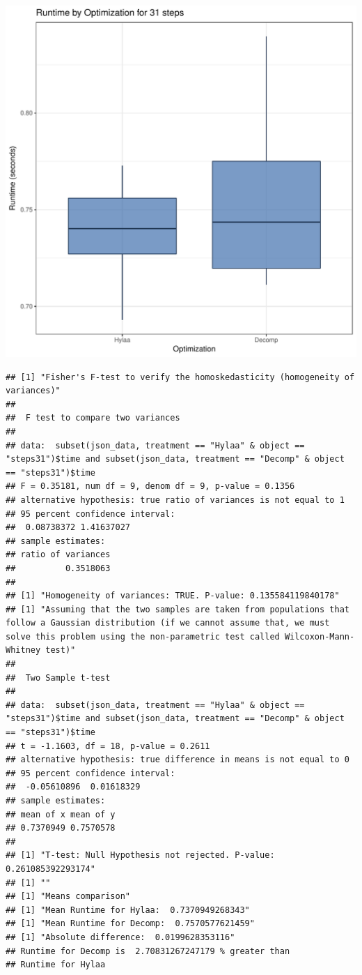 \documentclass{article}\usepackage[]{graphicx}\usepackage[]{color}
\makeatletter
\def\maxwidth{ %
  \ifdim\Gin@nat@width>\linewidth
    \linewidth
  \else
    \Gin@nat@width
  \fi
}
\newenvironment{kframe}{%
 \def\at@end@of@kframe{}%
 \ifinner\ifhmode%
  \def\at@end@of@kframe{\end{minipage}}%
  \begin{minipage}{\columnwidth}%
 \fi\fi%
 \def\FrameCommand##1{\hskip\@totalleftmargin \hskip-\fboxsep
 \colorbox{shadecolor}{##1}\hskip-\fboxsep
     \hskip-\linewidth \hskip-\@totalleftmargin \hskip\columnwidth}%
 \MakeFramed {\advance\hsize-\width
   \@totalleftmargin\z@ \linewidth\hsize
   \@setminipage}}%
 {\par\unskip\endMakeFramed%
 \at@end@of@kframe}
\newenvironment{knitrout}{}{} %
\makeatother
\begin{document}
\begin{knitrout}
\color{fgcolor}
\includegraphics[width=\maxwidth]{figure/RH2_steps31-1} 
\begin{kframe}\begin{verbatim}
## [1] "Fisher's F-test to verify the homoskedasticity (homogeneity of variances)"
## 
## 	F test to compare two variances
## 
## data:  subset(json_data, treatment == "Hylaa" & object == "steps31")$time and subset(json_data, treatment == "Decomp" & object == "steps31")$time
## F = 0.35181, num df = 9, denom df = 9, p-value = 0.1356
## alternative hypothesis: true ratio of variances is not equal to 1
## 95 percent confidence interval:
##  0.08738372 1.41637027
## sample estimates:
## ratio of variances 
##          0.3518063 
## 
## [1] "Homogeneity of variances: TRUE. P-value: 0.135584119840178"
## [1] "Assuming that the two samples are taken from populations that follow a Gaussian distribution (if we cannot assume that, we must solve this problem using the non-parametric test called Wilcoxon-Mann-Whitney test)"
## 
## 	Two Sample t-test
## 
## data:  subset(json_data, treatment == "Hylaa" & object == "steps31")$time and subset(json_data, treatment == "Decomp" & object == "steps31")$time
## t = -1.1603, df = 18, p-value = 0.2611
## alternative hypothesis: true difference in means is not equal to 0
## 95 percent confidence interval:
##  -0.05610896  0.01618329
## sample estimates:
## mean of x mean of y 
## 0.7370949 0.7570578 
## 
## [1] "T-test: Null Hypothesis not rejected. P-value: 0.261085392293174"
## [1] ""
## [1] "Means comparison"
## [1] "Mean Runtime for Hylaa:  0.7370949268343"
## [1] "Mean Runtime for Decomp:  0.7570577621459"
## [1] "Absolute difference:  0.0199628353116"
## Runtime for Decomp is  2.70831267247179 % greater than 
## Runtime for Hylaa
\end{verbatim}
\end{kframe}
\end{knitrout}
\end{document}

